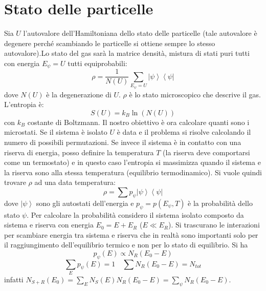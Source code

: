 \section{Stato delle particelle} %
Sia $U$ l'autovalore dell'Hamiltoniana dello stato delle particelle (tale autovalore è degenere perché scambiando le particelle si ottiene sempre lo stesso autovalore).Lo stato del gas sarà la matrice densità, mistura di stati puri tutti con energia $E_{\psi}=U$ tutti equiprobabili:
\begin{equation}
\rho=\frac{1}{N\left(U\right)}\sum_{E_{\psi}=U}{\left |\psi  \right\rangle\left\langle \psi \right |}
\end{equation} 
dove $N(U)$ è la degenerazione di $U$. $\rho$ è lo stato microscopico che descrive il gas.
L'entropia è:
\begin{equation*}
S\left(U\right)=k_B\ln{\left(N\left(U\right)\right)}
\end{equation*}
con $k_B$ costante di Boltzmann.
Il nostro obiettivo è ora calcolare quanti sono i microstati. Se il sistema è isolato $U$ è data e il problema si risolve calcolando il numero di possibili permutazioni. Se invece il sistema è in contatto con una riserva di energia, posso definire la temperatura $T$ (la riserva deve comportarsi come un termostato) e in questo caso l'entropia si massimizza quando il sistema e la riserva sono alla stessa temperatura (equilibrio termodinamico). 
Si vuole quindi trovare $\rho$ ad una data temperatura:
\begin{equation*}
\rho=\sum{p_\psi \left |\psi  \right\rangle\left\langle \psi \right |}
\end{equation*}
dove $\left |\psi  \right\rangle$ sono gli autostati dell'energia e $p_\psi =p\left(E_\psi ,T\right)$ è la probabilità dello stato $\psi $. Per calcolare la probabilità considero il sistema isolato composto da sistema e riserva con energia $E_0=E+E_R$ ($E\ll E_R$). Si trascurano le interazioni per scambiare energia tra sistema e riserva che in realtà sono importanti solo per il raggiungimento dell'equilibrio termico e non per lo stato di equilibrio. Si ha 
\begin{equation*}
p_\psi \left(E\right)\propto N_R\left(E_0-E\right)
\end{equation*}
\begin{equation*}
\sum_{E}{p_\psi \left(E\right)}=1 \quad \sum{N_R\left(E_0-E\right)}=N_{tot}
\end{equation*}
infatti $N_{S+R}(E_0)= \sum_E N_S (E) N_R(E_0-E)= \sum_{\psi} N_R(E_0-E)$.

